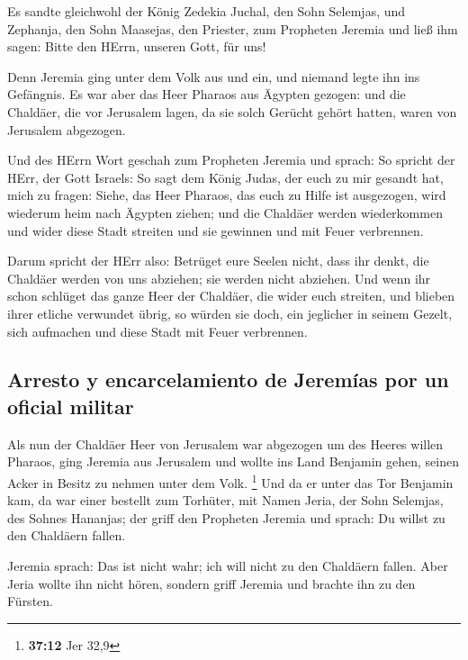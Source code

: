  Es sandte gleichwohl der König Zedekia Juchal, den Sohn
Selemjas, und Zephanja, den Sohn Maasejas, den Priester, zum Propheten
Jeremia und ließ ihm sagen: Bitte den HErrn, unseren Gott, für uns!

 Denn Jeremia ging unter dem Volk aus und ein, und niemand
legte ihn ins Gefängnis.  Es war aber das Heer Pharaos aus
Ägypten gezogen: und die Chaldäer, die vor Jerusalem lagen, da sie solch
Gerücht gehört hatten, waren von Jerusalem abgezogen.

 Und des HErrn Wort geschah zum Propheten Jeremia und
sprach:  So spricht der HErr, der Gott Israels: So sagt
dem König Judas, der euch zu mir gesandt hat, mich zu fragen: Siehe, das
Heer Pharaos, das euch zu Hilfe ist ausgezogen, wird wiederum heim nach
Ägypten ziehen;  und die Chaldäer werden wiederkommen und
wider diese Stadt streiten und sie gewinnen und mit Feuer verbrennen.

 Darum spricht der HErr also: Betrüget eure Seelen nicht,
dass ihr denkt, die Chaldäer werden von uns abziehen; sie werden nicht
abziehen.  Und wenn ihr schon schlüget das ganze Heer der
Chaldäer, die wider euch streiten, und blieben ihrer etliche verwundet
übrig, so würden sie doch, ein jeglicher in seinem Gezelt, sich
aufmachen und diese Stadt mit Feuer verbrennen.

\hypertarget{arresto-y-encarcelamiento-de-jeremuxedas-por-un-oficial-militar}{%
\subsection{Arresto y encarcelamiento de Jeremías por un oficial
militar}\label{arresto-y-encarcelamiento-de-jeremuxedas-por-un-oficial-militar}}

 Als nun der Chaldäer Heer von Jerusalem war abgezogen um
des Heeres willen Pharaos,  ging Jeremia aus Jerusalem
und wollte ins Land Benjamin gehen, seinen Acker in Besitz zu nehmen
unter dem Volk. \footnote{\textbf{37:12} Jer 32,9}  Und
da er unter das Tor Benjamin kam, da war einer bestellt zum Torhüter,
mit Namen Jeria, der Sohn Selemjas, des Sohnes Hananjas; der griff den
Propheten Jeremia und sprach: Du willst zu den Chaldäern fallen.

 Jeremia sprach: Das ist nicht wahr; ich will nicht zu
den Chaldäern fallen. Aber Jeria wollte ihn nicht hören, sondern griff
Jeremia und brachte ihn zu den Fürsten.


